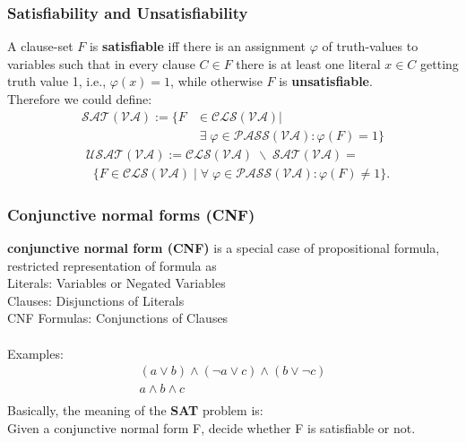 \documentclass{beamer}
\def\mva{{\mathcal{VA}}}
\def\mpass{{\mathcal{PASS}}}
\def\mcls{{\mathcal{CLS}}}
\def\msat{{\mathcal{SAT}}}
\def\musat{{\mathcal{USAT}}}
\begin{document}
\begin{frame}
\frametitle{Satisfiability and Unsatisfiability}
A clause-set $F$ is \textbf{satisfiable} iff there is an assignment $\varphi$ of truth-values to variables such that in every clause $C \in F$ there is at least one literal $x \in C$ getting truth value 1, i.e., $\varphi(x) = 1$, while otherwise $F$ is \textbf{unsatisfiable}.\\
Therefore we could define:
\begin{align*}
\pmb{\msat(\mva)} := \{ F & \in \mcls(\mva)| \\
& \; \exists \; \varphi \in \mpass(\mva) : \varphi(F) = 1 \}
\end{align*}
\begin{align*}
& \pmb{\musat(\mva)} := \mcls(\mva) \;\backslash\; \msat(\mva) = \\
& \;\; \{F\in \mcls(\mva) \mid \forall\; \varphi \in \mpass(\mva) : \varphi(F) \neq 1\}.
\end{align*}

\end{frame}

\begin{frame}
\frametitle{Conjunctive normal forms (CNF)}
\textbf{conjunctive normal form (CNF)} is a special case of propositional formula, restricted representation of formula as\\
Literals: Variables or Negated Variables\\
Clauses: Disjunctions of Literals\\
CNF Formulas: Conjunctions of Clauses\\~\\
Examples:
\begin{eqnarray*}
&(a\vee b) \wedge (\neg a \vee c) \wedge (b\vee \neg c)& \\
&a\wedge b \wedge c& \\
\end{eqnarray*}
Basically, the meaning of the \textbf{SAT} problem is:\\
Given a conjunctive normal form F, decide whether F is satisfiable or not.
\end{frame}


\end{document}
